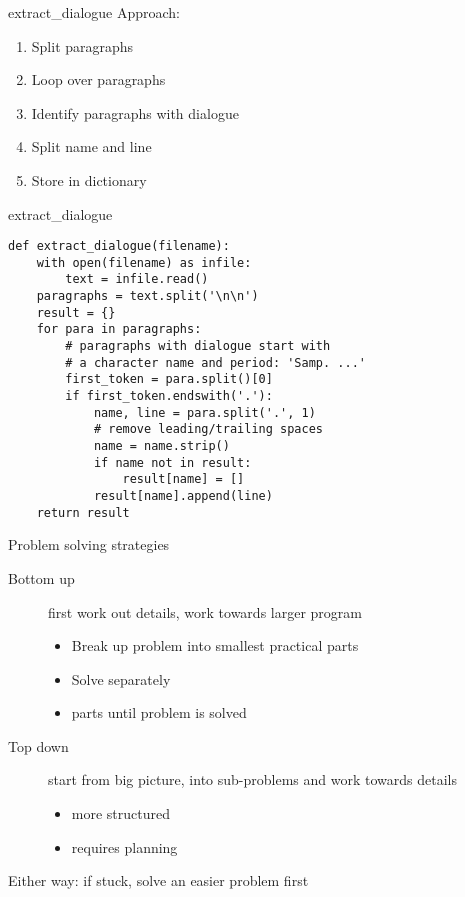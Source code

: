 \documentclass[aspectratio=169,usenames,dvipsnames]{beamer}
\begin{document}
\begin{frame}[fragile]{extract\_dialogue}
    Approach:
    \begin{enumerate}
        \item Split paragraphs
        \item Loop over paragraphs
        \item Identify paragraphs with dialogue
        \item Split name and line
        \item Store in dictionary
    \end{enumerate}
\end{frame}

\begin{frame}[fragile]{extract\_dialogue}
\begin{lstlisting}
def extract_dialogue(filename):
    with open(filename) as infile:
        text = infile.read()
    paragraphs = text.split('\n\n')
    result = {}
    for para in paragraphs:
        # paragraphs with dialogue start with
        # a character name and period: 'Samp. ...'
        first_token = para.split()[0]
        if first_token.endswith('.'):
            name, line = para.split('.', 1)
            # remove leading/trailing spaces
            name = name.strip()
            if name not in result:
                result[name] = []
            result[name].append(line)
    return result
\end{lstlisting}
\end{frame}

\begin{frame}{Problem solving strategies}
    \begin{description}
        \item[Bottom up] first work out details, work towards larger program
            \begin{itemize}
                \item Break up problem into smallest practical parts
                \item Solve separately
                \item {} parts until problem is solved
            \end{itemize}
        \item[Top down] start from big picture,  into sub-problems and work towards details
            \begin{itemize}
                \item more structured
                \item requires planning
            \end{itemize}
    \end{description}

    \vspace{1em}
    Either way: if stuck, solve an easier problem first
\end{frame}
\end{document}
